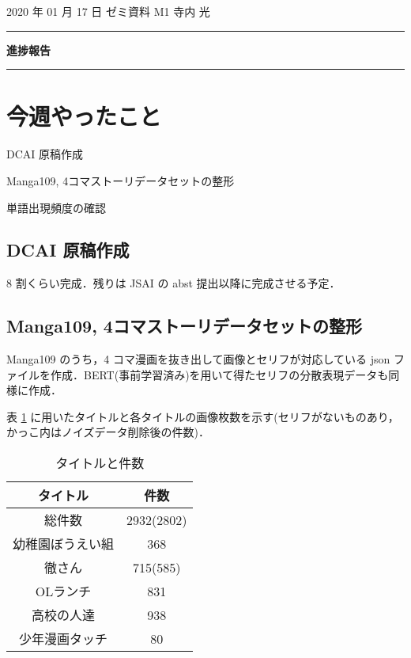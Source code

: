 \documentclass[onecolumn]{ujarticle}   %
\begin{document}
	\noindent

	\hspace{1em}
	2020 年 01 月 17 日
	ゼミ資料
	\hfill
	M1 寺内 光

	\vspace{2mm}

	\hrule

	\begin{center}
		{\Large \bf 進捗報告}
	\end{center}


	\hrule
	\vspace{3mm}

	\section{今週やったこと}
	\begin{itemize}{
		\item{DCAI 原稿作成}
		\item{Manga109, 4コマストーリデータセットの整形}
		\item{単語出現頻度の確認}
	}
	\end{itemize}

	\subsection{DCAI 原稿作成}
	8 割くらい完成．残りは JSAI の abst 提出以降に完成させる予定．

	\subsection{Manga109, 4コマストーリデータセットの整形}
	Manga109 のうち，4 コマ漫画を抜き出して画像とセリフが対応している json ファイルを作成．BERT(事前学習済み)を用いて得たセリフの分散表現データも同様に作成．

	表 \ref{tab:num_dataset} に用いたタイトルと各タイトルの画像枚数を示す(セリフがないものあり，かっこ内はノイズデータ削除後の件数)．

	\begin{table}[h]
		\vspace{-3mm}
		\centering
		\caption{タイトルと件数}
		\label{tab:num_dataset}
		\begin{tabular}{|c|c|} \hline
			タイトル&件数\\ \hline\hline
			総件数&2932(2802)\\ \hline
			幼稚園ぼうえい組&368\\ \hline
			徹さん&715(585)\\ \hline
			OLランチ&831\\ \hline
			高校の人達&938\\ \hline
			少年漫画タッチ&80\\ \hline
		\end{tabular}
	\end{table}
\end{document}
